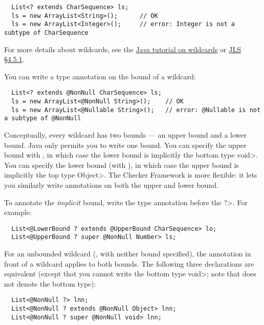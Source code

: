 \begin{Verbatim}
  List<? extends CharSequence> ls;
  ls = new ArrayList<String>();      // OK
  ls = new ArrayList<Integer>();     // error: Integer is not a subtype of CharSequence
\end{Verbatim}

For more details about wildcards, see the
\href{https://docs.oracle.com/javase/tutorial/java/generics/wildcards.html}{Java
  tutorial on wildcards} or
\href{https://docs.oracle.com/javase/specs/jls/se11/html/jls-4.html#jls-4.5.1}{JLS
  \S 4.5.1}.

You can write a type annotation on the bound of a wildcard:

\begin{Verbatim}
  List<? extends @NonNull CharSequence> ls;
  ls = new ArrayList<@NonNull String>();    // OK
  ls = new ArrayList<@Nullable String>();   // error: @Nullable is not a subtype of @NonNull
\end{Verbatim}

Conceptually, every wildcard has two bounds --- an upper bound and a lower
bound.  Java only permits you to write one bound.
You can specify the upper bound with , in which
case the lower bound is implicitly the bottom type \<void>.
You can specify the lower bound (with ), in
which case the upper bound is implicitly the top type \<Object>.
The Checker Framework is more flexible:  it lets you similarly write
annotations on both the upper and lower bound.

To annotate the \emph{implicit} bound, write the type annotation
before the \<?>.  For example:

\begin{Verbatim}
  List<@LowerBound ? extends @UpperBound CharSequence> lo;
  List<@UpperBound ? super @NonNull Number> ls;
\end{Verbatim}

For an unbounded wildcard (, with neither
bound specified), the annotation in front of a wildcard applies
to both bounds.  The following three declarations are equivalent (except
that you cannot write the bottom type \<void>; note that
 does not denote the bottom type):

\begin{Verbatim}
  List<@NonNull ?> lnn;
  List<@NonNull ? extends @NonNull Object> lnn;
  List<@NonNull ? super @NonNull void> lnn;
\end{Verbatim}

